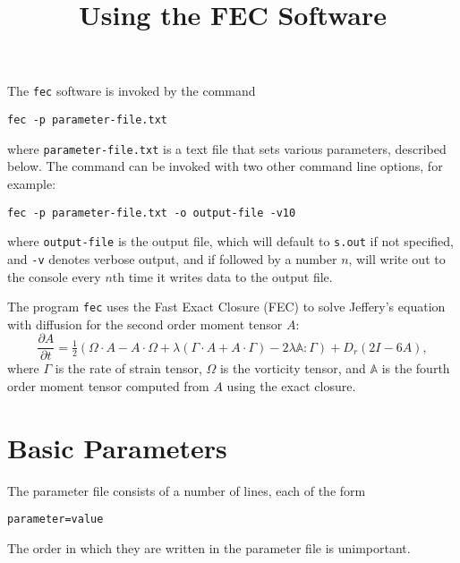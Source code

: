 \documentclass{amsart}
\title{Using the FEC Software}
\begin{document}
\maketitle

\noindent
The {\tt fec} software is invoked by the command
\begin{center}
{\tt fec -p parameter-file.txt}
\end{center}
where {\tt parameter-file.txt} is a text file that sets various parameters, described below.  The command can be invoked with two other command line options, for example:
\begin{center}
{\tt fec -p parameter-file.txt -o output-file -v10}
\end{center}
where {\tt output-file} is the output file, which will default to {\tt s.out} if not specified, and {\tt -v} denotes verbose output, and if followed by a number $n$, will write out to the console every $n$th time it writes data to the output file.

The program {\tt fec} uses the Fast Exact Closure (FEC) to solve Jeffery's equation \cite{jeffery} with diffusion for the second order moment tensor $A$:
$$ \frac {\partial A}{\partial t} = \tfrac12(\Omega\cdot A - A\cdot\Omega + \lambda(\Gamma\cdot A+A\cdot \Gamma) - 2 \lambda \mathbb A:\Gamma) + D_r (2I-6A) ,$$
where $\Gamma$ is the rate of strain tensor, $\Omega$ is the vorticity tensor, and $\mathbb A$ is the fourth order moment tensor computed from $A$ using the exact closure.

\section*{Basic Parameters}

\noindent
The parameter file consists of a number of lines, each of the form
\begin{center}
{\tt parameter=value}
\end{center}
The order in which they are written in the parameter file is unimportant.
\end{document}
